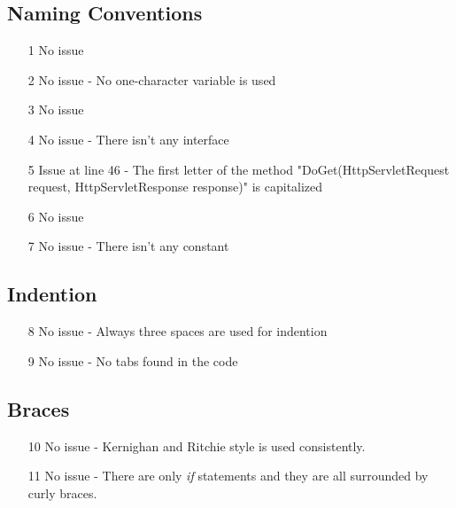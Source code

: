 \subsection{Naming Conventions}
\begin{itemize}
\item[1] No issue
\item[2] No issue - No one-character variable is used
\item[3] No issue
\item[4] No issue - There isn't any interface
\item[5] Issue at line 46 - The first letter of the method "DoGet(HttpServletRequest request, HttpServletResponse response)" is capitalized
\item[6] No issue
\item[7] No issue - There isn't any constant
\end{itemize}
\subsection{Indention}
\begin{itemize}
\item[8] No issue - Always three spaces are used for indention
\item[9] No issue - No tabs found in the code
\end{itemize}
\subsection{Braces}
\begin{itemize}
\item[10] No issue - Kernighan and Ritchie style is used consistently.
\item[11] No issue - There are only \textit{if} statements and they are all surrounded by curly braces.
\end{itemize}

